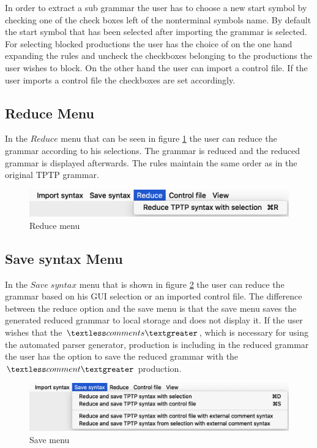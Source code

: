 In order to extract a sub grammar the user has to choose a new start symbol by checking one of the check boxes left of the nonterminal symbols name. By default the start symbol that has been selected after importing the grammar is selected. For selecting blocked productions the user has the choice of on the one hand expanding the rules and uncheck the checkboxes belonging to the productions the user wishes to block. On the other hand the user can import a control file. If the user imports a control file the checkboxes are set accordingly.

\subsection{Reduce Menu}\label{sec:ConceptGUIReduceMenu}

In the $Reduce$ menu that can be seen in figure \ref{fig:reduce} the user can reduce the grammar according to his selections. The grammar is reduced and the reduced grammar is displayed afterwards. The rules maintain the same order as in the original \ac{TPTP} grammar.

\begin{figure}[H]
\centering
\includegraphics[width=.7\textwidth]{images/reduce.png}
\caption{Reduce menu}
\label{fig:reduce}
\end{figure}

\subsection{Save syntax Menu}\label{sec:ConceptGUISaveSyntaxMenu}

In the $Save\;syntax$ menu that is shown in figure \ref{fig:save} the user can reduce the grammar based on his GUI selection or an imported control file. The difference between the reduce option and the save menu is that the save menu saves the generated reduced grammar to local storage and does not display it. If the user wishes that the $\textless comments\textgreater$, which is necessary for using the automated parser generator, production is including in the reduced grammar the user has the option to save the reduced grammar with the $\textless comment\textgreater$ production.

\begin{figure}[H]
\centering
\includegraphics[width=.7\textwidth]{images/save.png}
\caption{Save menu}
\label{fig:save}
\end{figure}

